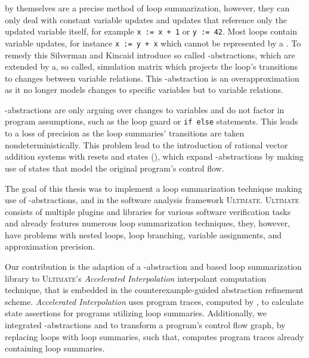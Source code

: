 \qvasr by themselves are a precise method of loop summarization, however, they can only deal with constant variable updates and updates that reference only the updated variable itself, for example \texttt{x := x + 1} or \texttt{y := 42}. Most loops contain variable updates, for instance \texttt{x := y + x} which cannot be represented by a \qvasr. To remedy this Silverman and Kincaid introduce so called \qvasr-abstractions, which are \qvasr extended by a, so called, simulation matrix which projects the loop's transitions to changes between variable relations. This \qvasr-abstraction is an overapproximation as it no longer models changes to specific variables but to variable relations.\\ \par

\qvasr-abstractions are only arguing over changes to variables and do not factor in program assumptions, such as the loop guard or \texttt{if else} statements. This leads to a loss of precision as the loop summaries' transitions are taken nondeterministically. This problem lead to the introduction of rational vector addition systems with resets and states (\qvasr), which expand \qvasr-abstractions by making use of states that model the original program's control flow.\\ \par

The goal of this thesis was to implement a loop summarization technique making use of \qvasr-abstractions, and \qvasrs in the software analysis framework \textsc{Ultimate}\cite{Zitat02}.
\textsc{Ultimate} consists of multiple plugins and libraries for various software verification tasks and already features numerous loop summarization techniques, they, however, have problems with nested loops, loop branching, variable assignments, and approximation precision.\\  \par
Our contribution is the adaption of a \qvasr-abstraction and \qvasrs based loop summarization library to \textsc{Ultimate}'s \textsl{Accelerated Interpolation} interpolant computation technique, that is embedded in the \traceabstraction \cite{10.1007/978-3-642-03237-0_7} counterexample-guided abstraction refinement scheme. \textsl{Accelerated Interpolation} uses program traces, computed by \traceabstraction, to calculate state assertions for programs utilizing loop summaries. Additionally, we integrated \qvasr-abstractions and \qvasrs to transform a program's control flow graph, by replacing loops with loop summaries, such that, \traceabstraction computes program traces already containing loop summaries.\\ \par

